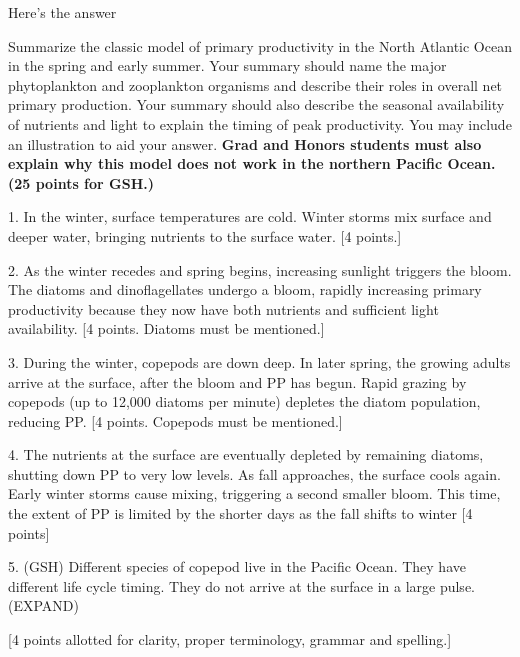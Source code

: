 \documentclass[11pt]{exam}
\begin{document}
\begin{questions}
\begin{minipage}[t][4in]{\textwidth}%
\begin{solution}
Here's the answer
\end{solution}
\end{minipage}
\newpage
 
\question[20]
Summarize the classic model of primary productivity in the North Atlantic Ocean in the spring and early summer.  Your summary should name the major phytoplankton and zooplankton organisms and describe their roles in overall net primary production.  Your summary should also describe the seasonal availability of nutrients and light to explain the timing of peak productivity.  You may include an illustration to aid your answer. \textbf{Grad and Honors students must also explain why this model does not work in the northern Pacific Ocean. (25 points for GSH.)}

\begin{solution}
1. In the winter, surface temperatures are cold. Winter storms mix surface and deeper water, bringing nutrients to the surface water. [4 points.] 

2. As the winter recedes and spring begins, increasing sunlight triggers the bloom. The diatoms and dinoflagellates undergo a bloom, rapidly increasing primary productivity because they now have both nutrients and sufficient light availability. [4 points. Diatoms must be mentioned.]

3. During the winter, copepods are down deep. In later spring, the growing adults arrive at the surface, after the bloom and PP has begun. Rapid grazing by copepods (up to 12,000 diatoms per minute) depletes the diatom population, reducing PP. [4 points. Copepods must be mentioned.]

4. The nutrients at the surface are eventually depleted by remaining diatoms, shutting down PP to very low levels. As fall approaches, the surface cools again. Early winter storms cause mixing, triggering a second smaller bloom.  This time, the extent of PP is limited by the shorter days as the fall shifts to winter [4 points]

5. (GSH) Different species of copepod live in the Pacific Ocean. They have different life cycle timing. They do not arrive at the surface in a large pulse. (EXPAND)

[4 points allotted for clarity, proper terminology, grammar and spelling.]


\end{solution}


\end{questions}
\end{document}
